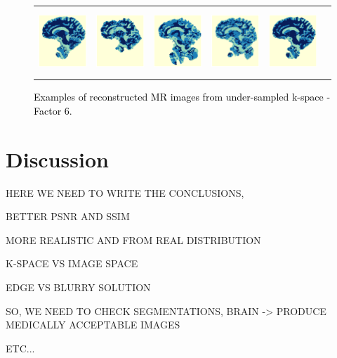 \documentclass[review]{elsarticle}
\begin{document}
\begin{figure}[H]
\begin{raggedleft}
\begin{tabular}{cccccc}
			\includegraphics[width=2.5cm,height=2.5cm]{include/grp2/factor6/022-Guys-0701-T1/022-Guys-0701-T1_segs__50} &
			\includegraphics[width=2.5cm,height=2.5cm]{include/grp2/factor6/022-Guys-0701-T1/022-Guys-0701-T1_segs__zeroPadding_50} & \includegraphics[width=2.5cm,height=2.5cm]{include/grp2/factor6/022-Guys-0701-T1/022-Guys-0701-T1_segs__CS_50} & \includegraphics[width=2.5cm]{include/grp2/factor6/022-Guys-0701-T1/022-Guys-0701-T1_segs__IMCNNL2TUNE_50} & \includegraphics[width=2.5cm,height=2.5cm]{include/grp2/factor6/022-Guys-0701-T1/022-Guys-0701-T1_segs__predict_50}
			
			
		\end{tabular}
		\par\end{raggedleft}
	\raggedright{}\caption{\textcolor{black}{\footnotesize{}Examples of reconstructed MR images from under-sampled k-space - Factor 6.}}
	\label{fig:example_factor_6} 
\end{figure}

\section{Discussion}\label{conclusions_section}
{\color{red}HERE WE NEED TO WRITE THE CONCLUSIONS, 

BETTER PSNR AND SSIM

MORE REALISTIC AND FROM REAL DISTRIBUTION

K-SPACE VS IMAGE SPACE

EDGE VS BLURRY SOLUTION

SO, WE NEED TO CHECK SEGMENTATIONS, BRAIN -> PRODUCE MEDICALLY ACCEPTABLE IMAGES

ETC...
}
\end{document}
